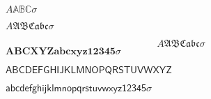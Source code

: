 \documentclass{article}
\begin{document}

$A\mathbb{ABC} \sigma$

$A\mathfrak{ABC} \mathfrak{abc} \sigma$

$$A\mathfrak{ABC} \mathfrak{abc} \sigma$$
$\mathbf{ABCXYZ} \mathbf{abcxyz} \mathbf{12345} \sigma$

$\mathsf{ABCDEFGHIJKLMNOPQRSTUVWXYZ}$

$\mathsf{abcdefghijklmnopqrstuvwxyz} \mathsf{12345} \sigma$


\end{document}
